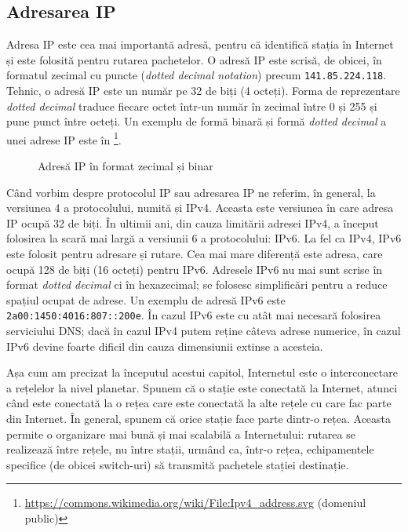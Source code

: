 \subsection{Adresarea IP}
\label{sec:net:tcp-ip:ip-address}

Adresa IP este cea mai importantă adresă, pentru că identifică stația în Internet și este folosită pentru rutarea pachetelor.
O adresă IP este scrisă, de obicei, în formatul zecimal cu puncte (\textit{dotted decimal notation}) precum \texttt{141.85.224.118}.
Tehnic, o adresă IP este un număr pe 32 de biți (4 octeți).
Forma de reprezentare \textit{dotted decimal} traduce fiecare octet într-un număr în zecimal între 0 și 255 și pune punct între octeți.
Un exemplu de formă binară și formă \textit{dotted decimal} a unei adrese IP este în \footnote{\url{https://commons.wikimedia.org/wiki/File:Ipv4\_address.svg} (domeniul public)}.

\begin{figure}[htbp]
  \centering
  \def\svgwidth{\columnwidth}
  
  \caption{Adresă IP în format zecimal și binar}
  \label{fig:net:ip-address-formats}
\end{figure}

Când vorbim despre protocolul IP sau adresarea IP ne referim, în general, la versiunea 4 a protocolului, numită și IPv4.
Aceasta este versiunea în care adresa IP ocupă 32 de biți.
În ultimii ani, din cauza limitării adresei IPv4, a început folosirea la scară mai largă a versiunii 6 a protocolului: IPv6.
La fel ca IPv4, IPv6 este folosit pentru adresare și rutare.
Cea mai mare diferență este adresa, care ocupă 128 de biți (16 octeți) pentru IPv6.
Adresele IPv6 nu mai sunt scrise în format \textit{dotted decimal} ci în hexazecimal; se folosesc simplificări pentru a reduce spațiul ocupat de adrese.
Un exemplu de adresă IPv6 este \texttt{2a00:1450:4016:807::200e}.
În cazul IPv6 este cu atât mai necesară folosirea serviciului DNS;
dacă în cazul IPv4 putem reține câteva adrese numerice, în cazul IPv6 devine foarte dificil din cauza dimensiunii extinse a acesteia.

Așa cum am precizat la începutul acestui capitol, Internetul este o interconectare a rețelelor la nivel planetar.
Spunem că o stație este conectată la Internet, atunci când este conectată la o rețea care este conectată la alte rețele cu care fac parte din Internet.
În general, spunem că orice stație face parte dintr-o rețea.
Aceasta permite o organizare mai bună și mai scalabilă a Internetului: rutarea se realizează între rețele, nu între stații, urmând ca, într-o rețea, echipamentele specifice (de obicei switch-uri) să transmită pachetele stației destinație.

